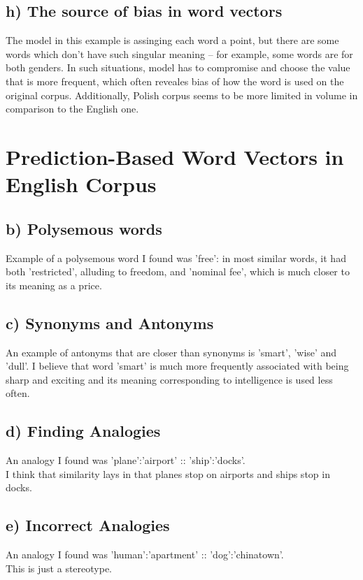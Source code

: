\documentclass[12pt]{article}
\begin{document}
\subsection*{h) The source of bias in word vectors}
The model in this example is assinging each word a point, but there are some 
words which don't have such singular meaning -- for example, some words are for 
both genders. In such situations, model has to compromise and choose the value 
that is more frequent, which often reveales bias of how the word is used on the 
original corpus. Additionally, Polish corpus seems to be more limited in volume 
in comparison to the English one.



\section{Prediction-Based Word Vectors in English Corpus}
\subsection*{b) Polysemous words}
Example of a polysemous word I found was 'free': in most similar words, it had 
both 'restricted', alluding to freedom, and 'nominal fee', which is much 
closer to its meaning as a price.

\subsection*{c) Synonyms and Antonyms}
An example of antonyms that are closer than synonyms is 'smart', 'wise' 
and 'dull'. I believe that word 'smart' is much more frequently associated with 
being sharp and exciting and its meaning corresponding to intelligence is used 
less often.

\subsection*{d) Finding Analogies}
An analogy I found was 'plane':'airport' :: 'ship':'docks'. \\
I think that similarity lays in that planes stop on airports and ships stop in 
docks.

\subsection*{e) Incorrect Analogies}
An analogy I found was 'human':'apartment' :: 'dog':'chinatown'. \\
This is just a stereotype.
\end{document}
